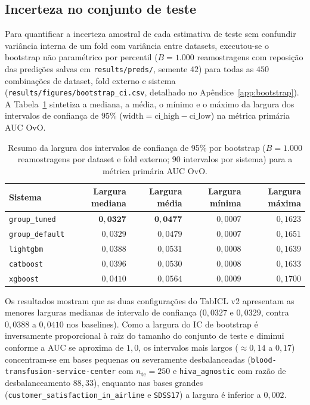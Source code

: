 \documentclass[11pt,a4paper]{article}
\begin{document}
\subsection{Incerteza no conjunto de teste}
\label{sec:bootstrap}

Para quantificar a incerteza amostral de cada estimativa de teste sem confundir variância interna de um fold com variância entre datasets, executou-se o bootstrap não paramétrico por percentil ($B = 1.000$ reamostragens com reposição das predições salvas em \texttt{results/preds/}, semente $42$) para todas as $450$ combinações de dataset, fold externo e sistema (\texttt{results/figures/bootstrap\_ci.csv}, detalhado no Apêndice~\ref{app:bootstrap}). A Tabela~\ref{tab:bootstrap_resumo} sintetiza a mediana, a média, o mínimo e o máximo da largura dos intervalos de confiança de $95\%$ ($\mathrm{width} = \mathrm{ci\_high} - \mathrm{ci\_low}$) na métrica primária AUC OvO.

\begin{table}[htbp]
    \centering
    \caption{Resumo da largura dos intervalos de confiança de 95\% por bootstrap ($B = 1.000$ reamostragens por dataset e fold externo; $90$ intervalos por sistema) para a métrica primária AUC OvO.}
    \label{tab:bootstrap_resumo}
    \small
    \begin{tabular}{@{}lrrrr@{}}
        \toprule
        \textbf{Sistema} & \textbf{Largura mediana} & \textbf{Largura média} & \textbf{Largura mínima} & \textbf{Largura máxima} \\
        \midrule
        \texttt{group\_tuned} & $\mathbf{0{,}0327}$ & $\mathbf{0{,}0477}$ & $0{,}0007$ & $0{,}1623$ \\
        \texttt{group\_default} & $0{,}0329$ & $0{,}0479$ & $0{,}0007$ & $0{,}1651$ \\
        \texttt{lightgbm} & $0{,}0388$ & $0{,}0531$ & $0{,}0008$ & $0{,}1639$ \\
        \texttt{catboost} & $0{,}0396$ & $0{,}0530$ & $0{,}0008$ & $0{,}1633$ \\
        \texttt{xgboost} & $0{,}0410$ & $0{,}0564$ & $0{,}0009$ & $0{,}1700$ \\
        \bottomrule
    \end{tabular}
\end{table}

Os resultados mostram que as duas configurações do TabICL v2 apresentam as menores larguras medianas de intervalo de confiança ($0{,}0327$ e $0{,}0329$, contra $0{,}0388$ a $0{,}0410$ nos baselines). Como a largura do IC de bootstrap é inversamente proporcional à raiz do tamanho do conjunto de teste e diminui conforme a AUC se aproxima de $1{,}0$, os intervalos mais largos ($\approx 0{,}14$ a $0{,}17$) concentram-se em bases pequenas ou severamente desbalanceadas (\texttt{blood-transfusion-service-center} com $n_{\mathrm{te}} = 250$ e \texttt{hiva\_agnostic} com razão de desbalanceamento $88{,}33$), enquanto nas bases grandes (\texttt{customer\_satisfaction\_in\_airline} e \texttt{SDSS17}) a largura é inferior a $0{,}002$.
\end{document}
